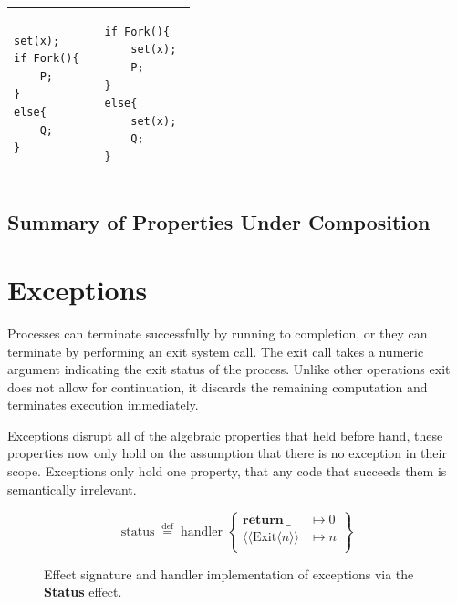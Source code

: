 \documentclass[logo,bsc,singlespacing,parskip]{infthesis}
\begin{document}
\vspace{-2em}
\begin{table}[H]
\centering
\begin{tabular}{p{} c p{}}
\begin{lstlisting}
set(x);
if Fork(){
    P;
}
else{
    Q;
}
\end{lstlisting}
&
&
\begin{lstlisting}
if Fork(){
    set(x); 
    P;
}
else{ 
    set(x); 
    Q;
}
\end{lstlisting}
\end{tabular}
\end{table}
\vspace{-2em}


\subsection{Summary of Properties Under Composition}


\section{Exceptions}
Processes can terminate successfully by running to completion, or they can terminate by performing an exit system call. The exit call takes a numeric argument indicating the exit status of the process. Unlike other operations exit does not allow for continuation, it discards the remaining computation and terminates execution immediately.

Exceptions disrupt all of the algebraic properties that held before hand, these properties now only hold on the assumption that there is no exception in their scope. Exceptions only hold one property, that any code that succeeds them is semantically irrelevant.


\begin{figure}[H]
\centering


\vspace{-1em}

\[
\mathrm{status} \;\overset{\mathrm{def}}{=}\;
\mathrm{handler} \;\left\{
\begin{array}{ll}
  \mathrm{\textbf{return}\:\_} & \mapsto 0 \\[0.5ex]
  \langle\!\langle \mathrm{Exit} \langle n\rangle\rangle & \mapsto n \\[0.5ex]
\end{array}
\right\}
\]

\caption{Effect signature and handler implementation of exceptions via the \textbf{Status} effect.}
\label{fig:status-handler}
\end{figure}
\end{document}
